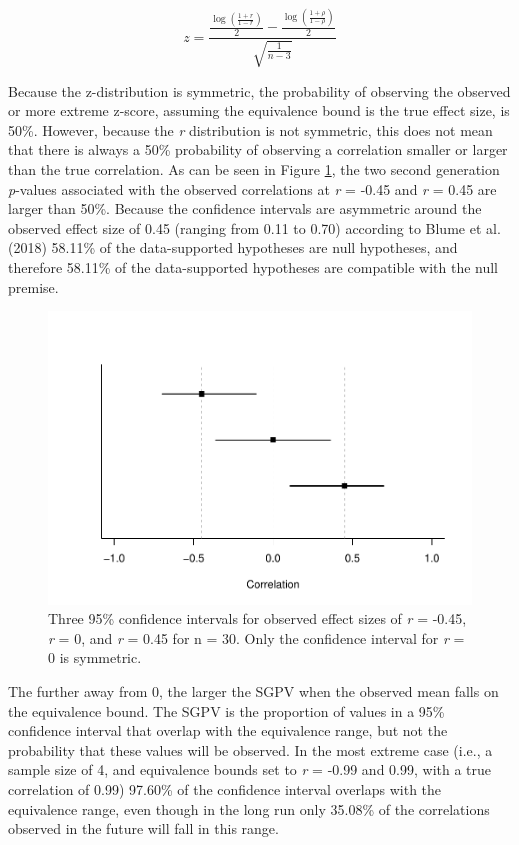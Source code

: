 \documentclass[,man,floatsintext]{apa6}
\begin{document}
\[
z = \frac{\frac{\log(\frac{1 + r}{ 1 - r})}{2} - \frac{\log(\frac{1 + \rho}{ 1 - \rho})}{2}}{\sqrt{\frac{1}{n-3}}}
\]

Because the z-distribution is symmetric, the probability of observing the observed or more extreme z-score, assuming the equivalence bound is the true effect size, is 50\%. However, because the \emph{r} distribution is not symmetric, this does not mean that there is always a 50\% probability of observing a correlation smaller or larger than the true correlation. As can be seen in Figure \ref{fig:TOSTSGPV12}, the two second generation \emph{p}-values associated with the observed correlations at \emph{r} = -0.45 and \emph{r} = 0.45 are larger than 50\%. Because the confidence intervals are asymmetric around the observed effect size of 0.45 (ranging from 0.11 to 0.70) according to Blume et al. (2018) 58.11\% of the data-supported hypotheses are null hypotheses, and therefore 58.11\% of the data-supported hypotheses are compatible with the null premise.

\begin{figure}
\centering
\includegraphics{manuscript.R2_files/figure-latex/TOSTSGPV12-1.pdf}
\caption{\label{fig:TOSTSGPV12}Three 95\% confidence intervals for observed effect sizes of \emph{r} = -0.45, \emph{r} = 0, and \emph{r} = 0.45 for n = 30. Only the confidence interval for \emph{r} = 0 is symmetric.}
\end{figure}

The further away from 0, the larger the SGPV when the observed mean falls on the equivalence bound. The SGPV is the proportion of values in a 95\% confidence interval that overlap with the equivalence range, but not the probability that these values will be observed. In the most extreme case (i.e., a sample size of 4, and equivalence bounds set to \emph{r} = -0.99 and 0.99, with a true correlation of 0.99) 97.60\% of the confidence interval overlaps with the equivalence range, even though in the long run only 35.08\% of the correlations observed in the future will fall in this range.
\end{document}
